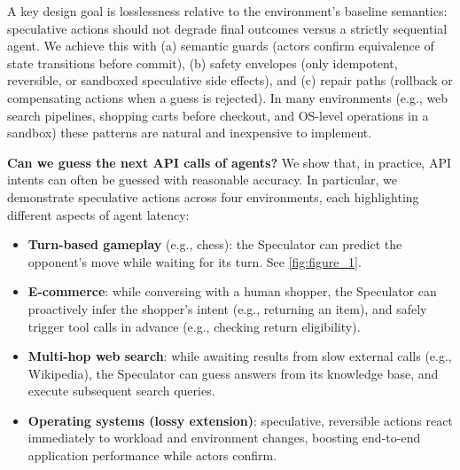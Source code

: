 \documentclass{article} %
\theoremstyle{plain} %
\theoremstyle{definition} %
\theoremstyle{remark} %
\begin{document}
A key design goal is losslessness relative to the environment’s baseline semantics: speculative actions should not degrade final outcomes versus a strictly sequential agent.
We achieve this with (a) semantic guards (actors confirm equivalence of state transitions before commit), (b) safety envelopes (only idempotent, reversible, or sandboxed speculative side effects), and (c) repair paths (rollback or compensating actions when a guess is rejected).
In many environments (e.g., web search pipelines, shopping carts before checkout, and OS-level operations in a sandbox) these patterns are natural and inexpensive to implement.


\textbf{Can we guess the next API calls of agents?} We show that, in practice, API intents can often be guessed with reasonable accuracy. In particular, we demonstrate speculative actions across four environments, each highlighting different aspects of agent latency:
\begin{itemize}[leftmargin=*]
    \item \textbf{Turn-based gameplay} (e.g., chess): the Speculator can predict the opponent's move while waiting for its turn.
See \cref{fig:figure_1}.
    \item \textbf{E-commerce}: while conversing with a human shopper, the Speculator can proactively infer the shopper's intent (e.g., returning an item), and safely trigger tool calls in advance (e.g., checking return eligibility).
    \item \textbf{Multi-hop web search}: while awaiting results from slow external calls (e.g., Wikipedia), the Speculator can guess answers from its knowledge base, and execute subsequent search queries.
 
    \item \textbf{Operating systems (lossy extension)}: speculative, reversible actions react immediately to workload and environment changes, boosting end-to-end application performance while actors confirm.
\end{itemize}

\end{document}
